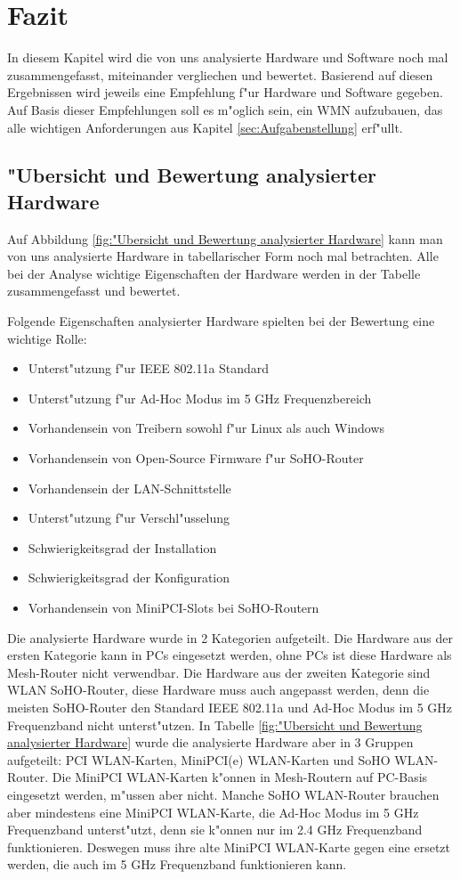 \section{Fazit}

In diesem Kapitel wird die von uns analysierte Hardware und Software noch
mal zusammengefasst, miteinander vergliechen und bewertet. Basierend
auf diesen Ergebnissen wird jeweils eine Empfehlung f"ur Hardware und
Software gegeben. Auf Basis dieser Empfehlungen soll es m"oglich sein,
ein WMN aufzubauen, das alle wichtigen Anforderungen aus Kapitel
\ref{sec:Aufgabenstellung} erf"ullt.

\subsection{"Ubersicht und Bewertung analysierter Hardware}

Auf Abbildung \ref{fig:"Ubersicht und Bewertung analysierter Hardware}
kann man von uns analysierte Hardware in tabellarischer Form noch mal
betrachten. Alle bei der Analyse wichtige Eigenschaften der Hardware
werden in der Tabelle zusammengefasst und bewertet.

Folgende Eigenschaften analysierter Hardware spielten bei der Bewertung
eine wichtige Rolle:

\begin{itemize}
\item Unterst"utzung f"ur IEEE 802.11a Standard
\item Unterst"utzung f"ur Ad-Hoc Modus im 5 GHz Frequenzbereich
\item Vorhandensein von Treibern sowohl f"ur Linux als auch Windows
\item Vorhandensein von Open-Source Firmware f"ur SoHO-Router
\item Vorhandensein der LAN-Schnittstelle
\item Unterst"utzung f"ur Verschl"usselung
\item Schwierigkeitsgrad der Installation
\item Schwierigkeitsgrad der Konfiguration
\item Vorhandensein von MiniPCI-Slots bei SoHO-Routern
\end{itemize}

Die analysierte Hardware wurde in 2 Kategorien aufgeteilt. Die Hardware
aus der ersten Kategorie kann in PCs eingesetzt werden, ohne PCs ist diese
Hardware als Mesh-Router nicht verwendbar. Die Hardware aus der zweiten
Kategorie sind WLAN SoHO-Router, diese Hardware muss auch angepasst werden,
denn die meisten SoHO-Router den Standard IEEE 802.11a und Ad-Hoc Modus
im 5 GHz Frequenzband nicht unterst"utzen. In Tabelle
\ref{fig:"Ubersicht und Bewertung analysierter Hardware} wurde die analysierte
Hardware aber in 3 Gruppen aufgeteilt: PCI WLAN-Karten, MiniPCI(e) WLAN-Karten
und SoHO WLAN-Router. Die MiniPCI WLAN-Karten k"onnen in Mesh-Routern auf
PC-Basis eingesetzt werden, m"ussen aber nicht. Manche SoHO WLAN-Router
brauchen aber mindestens eine MiniPCI WLAN-Karte, die Ad-Hoc Modus
im 5 GHz Frequenzband unterst"utzt, denn sie k"onnen nur im 2.4 GHz
Frequenzband funktionieren. Deswegen muss ihre alte MiniPCI WLAN-Karte gegen
eine ersetzt werden, die auch im 5 GHz Frequenzband funktionieren kann.

